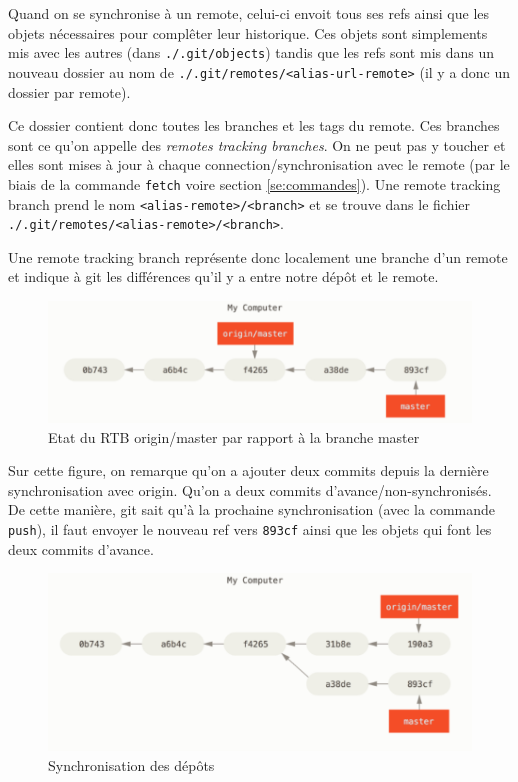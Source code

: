 \documentclass[a4paper, 12pt]{article}
\begin{document}
    Quand on se synchronise à un remote, celui-ci envoit tous ses refs ainsi que
    les objets nécessaires pour complêter leur historique. Ces objets sont
    simplements mis avec les autres (dans \lstinline{./.git/objects}) tandis que
    les refs sont mis dans un nouveau dossier au nom de
    \lstinline{./.git/remotes/<alias-url-remote>} (il y a donc un dossier par
    remote).

    Ce dossier contient donc toutes les branches et les tags du remote. Ces
    branches sont ce qu'on appelle des \textit{remotes tracking branches}. On
    ne peut pas y toucher et elles sont mises à jour à chaque 
    connection/synchronisation avec le remote (par le biais de la commande
    \lstinline{fetch} voire section \ref{se:commandes}). Une remote tracking
    branch prend le nom \lstinline{<alias-remote>/<branch>} et se trouve dans le
    fichier \lstinline{./.git/remotes/<alias-remote>/<branch>}. 

    Une remote tracking branch représente donc localement une branche d'un
    remote et indique à git les différences qu'il y a entre notre dépôt et le
    remote.

    \begin{figure}[H]
        \centering
        \includegraphics[width=\textwidth,]{figs/remote_tracking_branches.png}
        \caption{Etat du RTB origin/master par rapport à la branche master}
        \label{fig:rtbranches}
    \end{figure}

    Sur cette figure, on remarque qu'on a ajouter deux commits depuis la
    dernière synchronisation avec origin. Qu'on a deux commits
    d'avance/non-synchronisés. De cette manière, git sait qu'à la prochaine
    synchronisation (avec la commande \lstinline{push}), il faut envoyer le
    nouveau ref vers \lstinline{893cf} ainsi que les objets qui font les deux 
    commits d'avance.

    \begin{figure}[H]
        \centering
        \includegraphics[width=\textwidth,]{figs/fetch.png}
        \caption{Synchronisation des dépôts}
        \label{fig:fetch}
    \end{figure}
\end{document}
